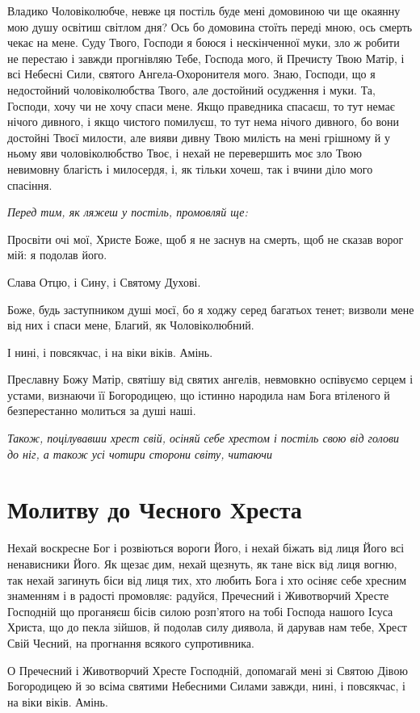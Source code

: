 \documentclass[chapters.tex]{subfiles}
\begin{document}
Владико Чоловіколюбче, невже ця постіль буде мені домовиною чи ще окаянну мою душу освітиш світлом дня? Ось бо домовина стоїть переді мною, ось смерть чекає на мене. Суду Твого, Господи я боюся і нескінченної муки, зло ж робити не перестаю і завжди прогнівляю Тебе, Господа мого, й Пречисту Твою Матір, і всі Небесні Сили, святого Ангела-Охоронителя мого. Знаю, Господи, що я недостойний чоловіколюбства Твого, але достойний осудження і муки. Та, Господи, хочу чи не хочу спаси мене. Якщо праведника спасаєш, то тут немає нічого дивного, і якщо чистого помилуєш, то тут нема нічого дивного, бо вони достойні Твоєї милости, але вияви дивну Твою милість на мені грішному й у ньому яви чоловіколюбство Твоє, і нехай не перевершить моє зло Твою невимовну благість і милосердя, і, як тільки хочеш, так і вчини діло мого спасіння.

\emph{Перед тим, як ляжеш у постіль, промовляй ще:}

Просвіти очі мої, Христе Боже, щоб я не заснув на смерть, щоб не сказав ворог мій: я подолав його.

Слава Отцю, і Сину, і Святому Духові.

Боже, будь заступником душі моєї, бо я ходжу серед багатьох тенет; визволи мене від них і спаси мене, Благий, як Чоловіколюбний.

І нині, і повсякчас, і на віки віків. Амінь.

Преславну Божу Матір, святішу від святих ангелів, невмовкно оспівуємо серцем і устами, визнаючи її Богородицею, що істинно народила нам Бога втіленого й безперестанно молиться за душі наші.

\emph{Також, поцілувавши хрест свій, осіняй себе хрестом і постіль свою від голови до ніг, а також усі чотири сторони світу, читаючи}

\section{Молитву до Чесного Хреста}
Нехай воскресне Бог і розвіються вороги Його, і нехай біжать від лиця Його всі ненависники Його. Як щезає дим, нехай щезнуть, як тане віск від лиця вогню, так нехай загинуть біси від лиця тих, хто любить Бога і хто осіняє себе хресним знаменням і в радості промовляє: радуйся, Пречесний і Животворчий Хресте Господній що проганяєш бісів силою розп’ятого на тобі Господа нашого Ісуса Христа, що до пекла зійшов, й подолав силу диявола, й дарував нам тебе, Хрест Свій Чесний, на прогнання всякого супротивника.

О Пречесний і Животворчий Хресте Господній, допомагай мені зі Святою Дівою Богородицею й зо всіма святими Небесними Силами завжди, нині, і повсякчас, і на віки віків. Амінь.
\end{document}
